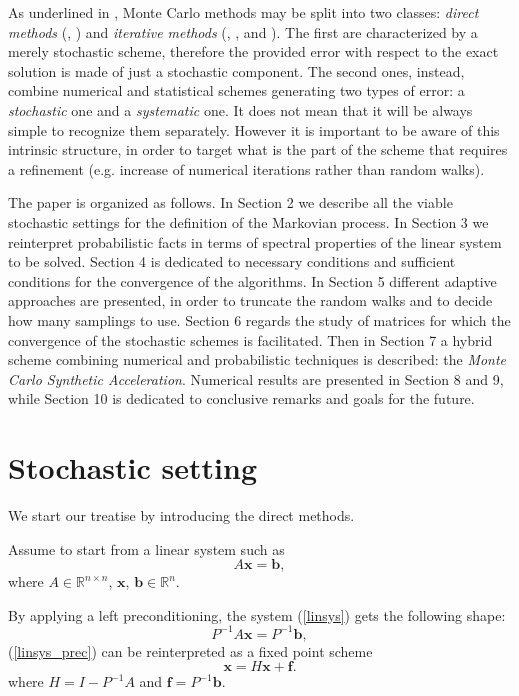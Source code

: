 \documentclass[a4paper,10pt]{article}
\begin{document}
As underlined in \cite{DA1998}, Monte Carlo methods may be split into two 
classes: \textit{direct methods} (\cite{DA1998}, \cite{DVA2001}) and 
\textit{iterative methods} (\cite{Hal1962}, 
\cite{Hal1994}, \cite{ESW2013} 
and \cite{EMSH2014}). The first are characterized by a merely stochastic 
scheme, 
therefore the provided error with respect to the exact solution is made of 
just a stochastic component. The second ones, instead, combine numerical and 
statistical schemes generating two types of error: a 
\textit{stochastic} one and a \textit{systematic} one. It does not 
mean 
that 
it will be always simple to recognize them separately. However it is important 
to 
be 
aware of this intrinsic structure, in order to target what is the part of the 
scheme that requires a refinement (e.g. increase of numerical iterations 
rather than random walks).\newline

The paper is organized as follows. In Section 2 we describe all the 
viable stochastic settings for the definition of the Markovian process. In 
Section 3 we reinterpret probabilistic facts in terms of spectral properties of 
the linear system to be solved. Section 4 is dedicated to necessary conditions 
and sufficient conditions for the convergence of the algorithms. In Section 5 
different adaptive approaches are presented, in order to truncate the random 
walks and to decide how many samplings to use. Section 6 regards the study 
of matrices for which the convergence of the stochastic schemes is facilitated. 
Then in Section 7 a hybrid scheme combining numerical and probabilistic 
techniques is described: the \textit{Monte Carlo Synthetic Acceleration}. 
Numerical results are presented in Section 8 and 9, while Section 10 is 
dedicated to 
conclusive remarks and goals for the future.

\section{Stochastic setting}

We start our treatise by introducing the direct methods.\newline

Assume to start from a linear system such as 
\begin{equation}
A \mathbf{x}=\mathbf{b},
\label{linsys}
\end{equation}
where $A\in \mathbb{R}^{n\times n}$, $\mathbf{x}$, $\mathbf{b} \in 
\mathbb{R}^n$. 

By applying a left preconditioning, the system (\ref{linsys}) gets the 
following shape:
\begin{equation}
P^{-1}A \mathbf{x}=P^{-1}\mathbf{b},
\label{linsys_prec}
\end{equation}
(\ref{linsys_prec}) can be 
reinterpreted as a fixed point scheme
\begin{equation}
 \mathbf{x}=H\mathbf{x}+\mathbf{f}.
 \label{fixedpoint}
\end{equation}
where $H=I-P^{-1}A$ and $\mathbf{f}=P^{-1}\mathbf{b}$.
\end{document}
